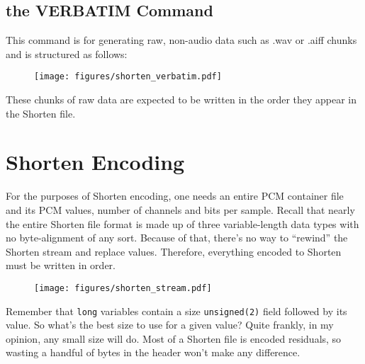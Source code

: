 \subsection{the VERBATIM Command}

This command is for generating raw, non-audio data such
as .wav or .aiff chunks and is structured as follows:
\begin{figure}[h]
\texttt{[image: figures/shorten\_verbatim.pdf]}
\end{figure}
\par
\noindent
These chunks of raw data are expected to be written in the order
they appear in the Shorten file.

\pagebreak

\section{Shorten Encoding}

For the purposes of Shorten encoding,
one needs an entire PCM container file and its
PCM values, number of channels and bits per sample.
Recall that nearly the entire Shorten file format is made up
of three variable-length data types with no byte-alignment of any sort.
Because of that, there's no way to ``rewind'' the Shorten stream
and replace values.
Therefore, everything encoded to Shorten must be written in order.

\begin{figure}[h]
\texttt{[image: figures/shorten\_stream.pdf]}
\end{figure}
\par
\noindent
Remember that \texttt{long} variables contain a size \texttt{unsigned(2)}
field followed by its value.
So what's the best size to use for a given value?
Quite frankly, in my opinion, any small size will do.
Most of a Shorten file is encoded residuals, so wasting a handful
of bytes in the header won't make any difference.

